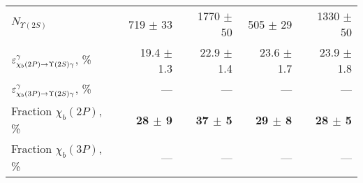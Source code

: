 \begin{table}[H]
{{\begin{tabular}{lrrrr}
\rule{0pt}{4ex}$N_{\Upsilon(2S)}$ & 719 $\pm$ 33 & 1770 $\pm$ 50 & 505 $\pm$ 29 & 1330 $\pm$ 50\\

\rule{0pt}{4ex}$\varepsilon_{\chi_b(2P) \rightarrow \Upsilon(2S) \gamma}^{\gamma}$, \% & 19.4 $\pm$ 1.3 & 22.9 $\pm$ 1.4 & 23.6 $\pm$ 1.7 & 23.9 $\pm$ 1.8\\
$\varepsilon_{\chi_b(3P) \rightarrow \Upsilon(2S) \gamma}^{\gamma}$, \% & --- & --- & --- & ---\\
\midrule
Fraction $\chi_b(2P)$, \% & \textbf{28 $\pm$ 9} & \textbf{37 $\pm$ 5} & \textbf{29 $\pm$ 8} & \textbf{28 $\pm$ 5}\\
Fraction $\chi_b(3P)$, \% & --- & --- & --- & ---\\
\bottomrule
\end{tabular}
} %

} %
\label{tab:frac:ups2s}
\end{table}


\begin{table}[H]
\caption{\small Summary of \Y3S fraction determination originating from \chib decay}
\centering
{} %
\label{tab:frac:ups3s}
\end{table}